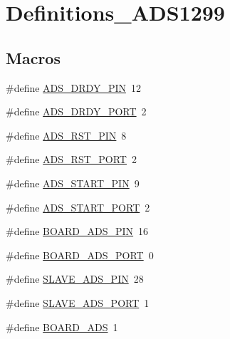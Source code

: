 \hypertarget{group___definitions___a_d_s1299}{}\section{Definitions\+\_\+\+A\+D\+S1299}
\label{group___definitions___a_d_s1299}
\subsection*{Macros}
\begin{DoxyCompactItemize}
\item 
\#define \hyperlink{group___definitions___a_d_s1299_ga154420761425fbc9f7b284f38b13aac8}{A\+D\+S\+\_\+\+D\+R\+D\+Y\+\_\+\+P\+I\+N}~12
\item 
\#define \hyperlink{group___definitions___a_d_s1299_gab717e0a1f047ab6cef64378e7aaae614}{A\+D\+S\+\_\+\+D\+R\+D\+Y\+\_\+\+P\+O\+R\+T}~2
\item 
\#define \hyperlink{group___definitions___a_d_s1299_ga97d980689ce74924d0e3847ba4e3af94}{A\+D\+S\+\_\+\+R\+S\+T\+\_\+\+P\+I\+N}~8
\item 
\#define \hyperlink{group___definitions___a_d_s1299_gadcc68648dbc7c6f5cccb4c425079db63}{A\+D\+S\+\_\+\+R\+S\+T\+\_\+\+P\+O\+R\+T}~2
\item 
\#define \hyperlink{group___definitions___a_d_s1299_ga29142efbcaa4833a5672a9a53d1304df}{A\+D\+S\+\_\+\+S\+T\+A\+R\+T\+\_\+\+P\+I\+N}~9
\item 
\#define \hyperlink{group___definitions___a_d_s1299_gadb0c5758685fb8a97022bbc188b36c11}{A\+D\+S\+\_\+\+S\+T\+A\+R\+T\+\_\+\+P\+O\+R\+T}~2
\item 
\#define \hyperlink{group___definitions___a_d_s1299_ga58a88a84a905c1965823bfa2c2e77fa6}{B\+O\+A\+R\+D\+\_\+\+A\+D\+S\+\_\+\+P\+I\+N}~16
\item 
\#define \hyperlink{group___definitions___a_d_s1299_ga27b778d3ec5d14180a1be88ed1badc02}{B\+O\+A\+R\+D\+\_\+\+A\+D\+S\+\_\+\+P\+O\+R\+T}~0
\item 
\#define \hyperlink{group___definitions___a_d_s1299_gae46878a3b492cfbb7a04412bc10e024f}{S\+L\+A\+V\+E\+\_\+\+A\+D\+S\+\_\+\+P\+I\+N}~28
\item 
\#define \hyperlink{group___definitions___a_d_s1299_gaf6a4cabfe52e3910ba27791ca5c22beb}{S\+L\+A\+V\+E\+\_\+\+A\+D\+S\+\_\+\+P\+O\+R\+T}~1
\item 
\#define \hyperlink{group___definitions___a_d_s1299_ga00b00a77ec0833201721a60e77c1589e}{B\+O\+A\+R\+D\+\_\+\+A\+D\+S}~1
\item 

\end{DoxyCompactItemize}
